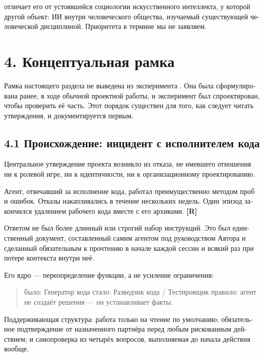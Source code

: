 \begin{russian}
 отличает его от устоявшейся социологии искусственного интеллекта, у которой другой объект: ИИ внутри человеческого общества, изучаемый существующей человеческой дисциплиной. Приоритета в термине мы не заявляем.


\section*{4. Концептуальная рамка}
\label{sec:ru:4}

Рамка настоящего раздела не выведена из эксперимента . Она была сформулирована ранее, в ходе обычной проектной работы, и эксперимент был спроектирован, чтобы проверить её часть. Этот порядок существен для того, как следует читать утверждения, и документируется первым.


\subsection*{4.1 Происхождение: инцидент с исполнителем кода}
\label{sec:ru:4.1}

Центральное утверждение проекта возникло из отказа, не имевшего отношения ни к ролевой игре, ни к идентичности, ни к организационному проектированию.

Агент, отвечавший за исполнение кода, работал преимущественно методом проб и ошибок. Отказы накапливались в течение нескольких недель. Один эпизод закончился удалением рабочего кода вместе с его архивами. \textbf{[R]}

Ответом не был более длинный или строгий набор инструкций. Это был единственный документ, составленный самим агентом под руководством Автора и сделанный обязательным к прочтению в начале каждой сессии и всякий раз при потере контекста внутри неё.

Его ядро — переопределение функции, а не усиление ограничения:

\begin{quote}
было: Генератор кода стало: Разведчик кода / Тестировщик правило: агент не создаёт решения — он устанавливает факты.
\end{quote}
Поддерживающая структура: работа только на чтение по умолчанию; обязательное подтверждение от назначенного партнёра перед любым рискованным действием; и самопроверка из четырёх вопросов, выполняемая до начала действия вообще.


\end{russian}
